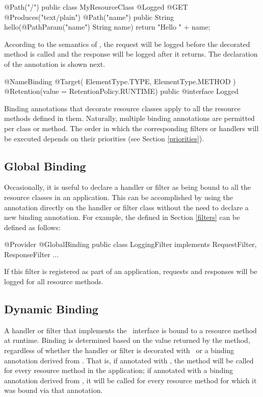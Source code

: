 \begin{listing}{1}
@Path("/")
public class MyResourceClass {
    @Logged
    @GET
    @Produces("text/plain")
    @Path("{name}")
    public String hello(@PathParam("name") String name) {
        return "Hello " + name;
    }
}
\end{listing}

According to the semantics of , the request will be logged before the decorated method is called and the response will be logged after it returns. The declaration of the  annotation is shown next.

\begin{listing}{1}
@NameBinding
@Target({ ElementType.TYPE, ElementType.METHOD })
@Retention(value = RetentionPolicy.RUNTIME)
public @interface Logged { }
\end{listing}

Binding annotations that decorate resource classes apply to all the resource methods defined in them. Naturally, multiple binding annotations are permitted per class or method. The order in which the corresponding filters or handlers will be executed depends on their priorities (see Section \ref{priorities}).

\subsection{Global Binding}

Occasionally, it is useful to declare a handler or filter as being bound to all the resource classes in an application. This can be accomplished by using the \GlobalBinding annotation directly on the handler or filter class without the need to declare a new binding annotation. For example, the  defined in Section \ref{filters} can be defined as follows:

\begin{listing}{1}
@Provider
@GlobalBinding
public class LoggingFilter implements RequestFilter, ResponseFilter {
    ...
}
\end{listing}

If this filter is registered as part of an application, requests and responses will be logged for all resource methods. 

\subsection{Dynamic Binding}

A handler or filter that implements the \DynamicBinding\ interface is bound to a resource method at runtime. Binding is determined based on the value returned by the  method, regardless of whether the handler or filter is decorated with \GlobalBinding\ or a binding annotation derived from \NameBinding. That is, if annotated with \GlobalBinding, the  method will be called for every resource method in the application; if annotated with a binding annotation derived from \NameBinding, it will be called for every resource method for which it was bound via that annotation.

